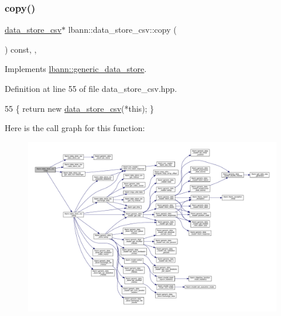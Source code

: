 \subsubsection{\texorpdfstring{copy()}{copy()}}
{\footnotesize\ttfamily \hyperlink{classlbann_1_1data__store__csv}{data\+\_\+store\+\_\+csv}$\ast$ lbann\+::data\+\_\+store\+\_\+csv\+::copy (\begin{DoxyParamCaption}{ }\end{DoxyParamCaption}) const\hspace{0.3cm}{\ttfamily [inline]}, {\ttfamily [override]}, {\ttfamily [virtual]}}



Implements \hyperlink{classlbann_1_1generic__data__store_ae06e089790aa023b839be508a3c020c6}{lbann\+::generic\+\_\+data\+\_\+store}.



Definition at line 55 of file data\+\_\+store\+\_\+csv.\+hpp.


\begin{DoxyCode}
55 \{ \textcolor{keywordflow}{return} \textcolor{keyword}{new} \hyperlink{classlbann_1_1data__store__csv_add3e9e9c37f1cdf0e3dba00cc6f49507}{data\_store\_csv}(*\textcolor{keyword}{this}); \}
\end{DoxyCode}
Here is the call graph for this function\+:\nopagebreak
\begin{figure}[H]
\begin{center}
\leavevmode
\includegraphics[width=350pt]{classlbann_1_1data__store__csv_a2e95f53f539a838e6c6484b9f4de5a45_cgraph}
\end{center}
\end{figure}
\mbox{\label{classlbann_1_1data__store__csv_acacd039d3ca8caf8958b731a1ce382c6}} 
